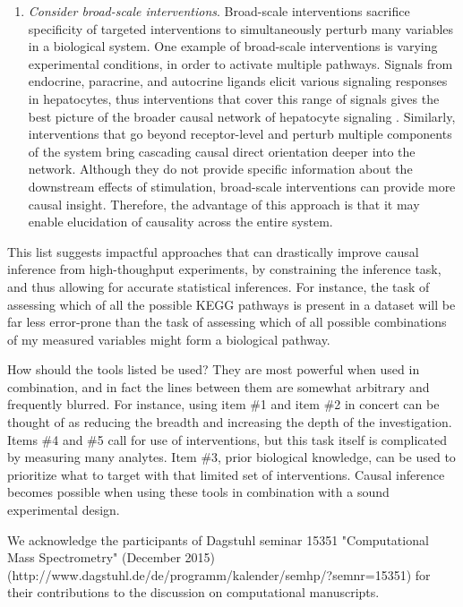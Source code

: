 \documentclass[journal=jacsat,manuscript=article]{achemso}
\begin{document}
\begin{enumerate}
\item \textit{Consider broad-scale interventions}. Broad-scale interventions sacrifice specificity of targeted interventions to simultaneously perturb many variables in a biological system. One example of broad-scale interventions is varying experimental conditions, in order to activate multiple pathways.  Signals from endocrine, paracrine, and autocrine ligands elicit various signaling responses in hepatocytes, thus interventions that cover this range of signals gives the best picture of the broader causal network of hepatocyte signaling \cite{alexopoulos2010networks}. Similarly, interventions that go beyond receptor-level and perturb multiple components of the system bring cascading causal direct orientation deeper into the network.  Although they do not provide specific information about the downstream effects of stimulation,  broad-scale interventions can provide more causal insight. Therefore, the advantage of this approach is that it may enable elucidation of  causality across the entire system.

\end{enumerate}

This list suggests impactful approaches that can drastically improve causal inference from high-thoughput experiments, by constraining the inference task, and thus allowing for accurate
statistical inferences. For instance, the task of assessing which of all
the possible KEGG pathways is present in a dataset will be far less
error-prone than the task of assessing which of all possible
combinations of my measured variables might form a biological pathway.

How should the tools listed be used? They are most powerful when used in
combination, and in fact the lines between them are somewhat arbitrary
and frequently blurred. For instance, using item \#1 and item \#2 in
concert can be thought of as reducing the breadth and increasing the
depth of the investigation. Items \#4 and \#5 call for use of
interventions, but this task itself is complicated by measuring many
analytes. Item
\#3, prior biological knowledge, can be used to prioritize what to
target with that limited set of interventions.  Causal inference becomes possible when using these tools in combination with a sound experimental design.

\begin{acknowledgement}
We acknowledge the participants of Dagstuhl seminar 15351 "Computational Mass Spectrometry" (December 2015) (http://www.dagstuhl.de/de/programm/kalender/semhp/?semnr=15351) for their contributions to the discussion on computational manuscripts.
\end{acknowledgement}

\end{document}
